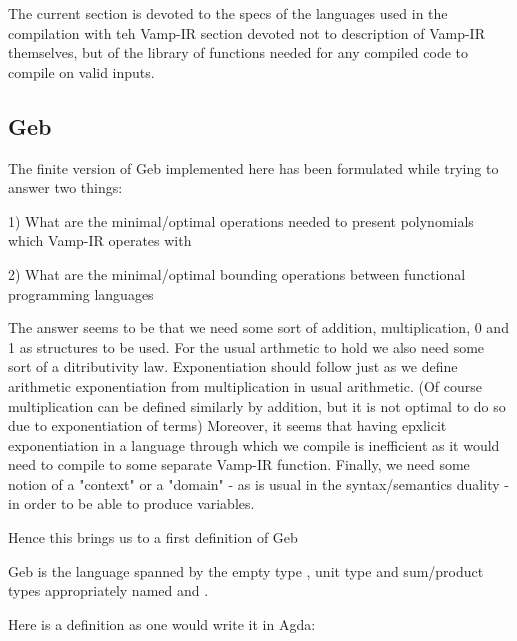 The current section is devoted to the specs of the languages used in the compilation with teh Vamp-IR section devoted not to description of Vamp-IR themselves, but of the library of functions needed for any compiled code to compile on valid inputs. 

\subsection{Geb}

The finite version of Geb implemented here has been formulated while trying to answer two things: 

1) What are the minimal/optimal operations needed to present polynomials which Vamp-IR operates with

2) What are the minimal/optimal bounding operations between functional programming languages

The answer seems to be that we need some sort of addition, multiplication, 0 and 1 as structures to be used. For the usual arthmetic to hold we also need some sort of a ditributivity law. Exponentiation should follow just as we define arithmetic exponentiation from multiplication in usual arithmetic. (Of course multiplication can be defined similarly by addition, but it is not optimal to do so due to exponentiation of terms) Moreover, it seems that having epxlicit exponentiation in a language through which we compile is inefficient as it would need to compile to some separate Vamp-IR function. Finally, we need some notion of a "context" or a "domain" - as is usual in the syntax/semantics duality - in order to be able to produce variables.

Hence this brings us to a first definition of Geb

\begin{definition}
Geb is the language spanned by the empty type , unit type \gebterm and sum/product types appropriately named \gebcoprod and \gebprod.
\end{definition}


Here is a definition as one would write it in Agda:

